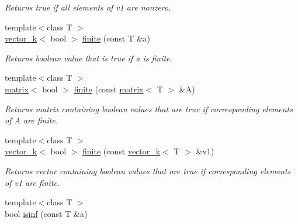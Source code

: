 \begin{DoxyCompactItemize}
\begin{DoxyCompactList}\small\item\em Returns true if all elements of v1 are nonzero. \end{DoxyCompactList}\item 
\hypertarget{namespacekeycpp_a97c154d91210f0af72e5047649ab2fb5}{{\footnotesize template$<$class T $>$ }\\\hyperlink{classkeycpp_1_1vector__k}{vector\-\_\-k}$<$ bool $>$ \hyperlink{namespacekeycpp_a97c154d91210f0af72e5047649ab2fb5}{finite} (const T \&a)}\label{namespacekeycpp_a97c154d91210f0af72e5047649ab2fb5}

\begin{DoxyCompactList}\small\item\em Returns boolean value that is true if a is finite. \end{DoxyCompactList}\item 
\hypertarget{namespacekeycpp_a8879482fc9af1a809453e1719948263b}{{\footnotesize template$<$class T $>$ }\\\hyperlink{classkeycpp_1_1matrix}{matrix}$<$ bool $>$ \hyperlink{namespacekeycpp_a8879482fc9af1a809453e1719948263b}{finite} (const \hyperlink{classkeycpp_1_1matrix}{matrix}$<$ T $>$ \&A)}\label{namespacekeycpp_a8879482fc9af1a809453e1719948263b}

\begin{DoxyCompactList}\small\item\em Returns matrix containing boolean values that are true if corresponding elements of A are finite. \end{DoxyCompactList}\item 
\hypertarget{namespacekeycpp_a83702fd83d07f4e3822abdcba5819dcb}{{\footnotesize template$<$class T $>$ }\\\hyperlink{classkeycpp_1_1vector__k}{vector\-\_\-k}$<$ bool $>$ \hyperlink{namespacekeycpp_a83702fd83d07f4e3822abdcba5819dcb}{finite} (const \hyperlink{classkeycpp_1_1vector__k}{vector\-\_\-k}$<$ T $>$ \&v1)}\label{namespacekeycpp_a83702fd83d07f4e3822abdcba5819dcb}

\begin{DoxyCompactList}\small\item\em Returns vector containing boolean values that are true if corresponding elements of v1 are finite. \end{DoxyCompactList}\item 
\hypertarget{namespacekeycpp_a852be6145adcca15ceaeb5a138651e20}{{\footnotesize template$<$class T $>$ }\\bool \hyperlink{namespacekeycpp_a852be6145adcca15ceaeb5a138651e20}{isinf} (const T \&a)}\label{namespacekeycpp_a852be6145adcca15ceaeb5a138651e20}


\end{DoxyCompactItemize}
